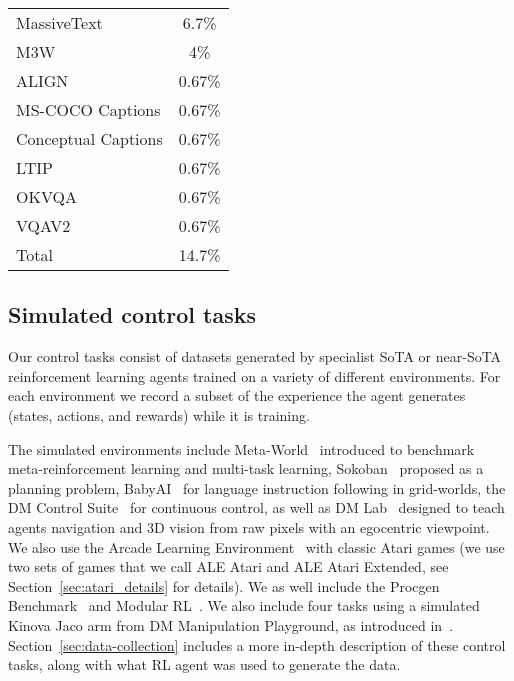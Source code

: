 \documentclass[10pt]{article} \usepackage[accepted]{tmlr}
\newcommand{\dmlab}{{DM Lab}}
\newcommand{\atari}{{ALE Atari}}
\newcommand{\ataritwo}{{ALE Atari Extended}}
\newcommand{\sokoban}{{Sokoban}}
\newcommand{\babyai}{{BabyAI}}
\newcommand{\dmcontrol}{{DM Control Suite}}
\newcommand{\metaworld}{{Meta-World}}
\newcommand{\procgen}{{Procgen Benchmark}}
\newcommand{\mrl}{{Modular RL}}
\newcommand{\mpg}{{DM Manipulation Playground}}
\begin{document}
\begin{table*}
{\begin{tabular}[t]{|l|c|}
        \hline
        MassiveText & 6.7\%  \\
        M3W & 4\% \\  
        ALIGN & 0.67\% \\
        MS-COCO Captions  & 0.67\% \\
        Conceptual Captions & 0.67\% \\
        LTIP& 0.67\% \\
        OKVQA & 0.67\% \\
        VQAV2 & 0.67\% \\
        \hline
        Total & 14.7\% \\
        \hline
    \end{tabular}
    }
\end{table*}
\vskip 0.4cm
\subsection{Simulated control tasks}
\vskip 0.2cm
Our control tasks consist of datasets generated by specialist SoTA or near-SoTA reinforcement learning agents trained on a variety of different environments.
For each environment we record a subset of the experience the agent generates (states, actions, and rewards) while it is training. 

The simulated environments include
\metaworld{}~\citep{yu2020meta} introduced to benchmark meta-reinforcement learning and multi-task learning, 
\sokoban{}~\citep{racaniere2017imagination} proposed as a planning problem,
\babyai{}~\citep{chevalier2018babyai} for language instruction following in grid-worlds,
the \dmcontrol{}~\citep{tunyasuvunakool2020dmcontrol} for continuous control, as well as
\dmlab{}~\citep{beattie2016deepmind} designed to teach agents navigation and 3D vision from raw pixels with an egocentric viewpoint.
We also use the Arcade Learning Environment~\citep{bellemare2013arcade} with classic Atari games (we use two sets of games that we call \atari{} and \ataritwo{}, see Section~\ref{sec:atari_details} for details).
We as well include the \procgen{}~\citep{cobbe2020leveraging} and  \mrl{}~\citep{huang2020one}.
We also include four tasks using a simulated Kinova Jaco arm from \mpg{}, as introduced in~\cite{zolna2020offline}.
Section~\ref{sec:data-collection} includes a more in-depth description of these control tasks, along with what RL agent was used to generate the data.
\end{document}
